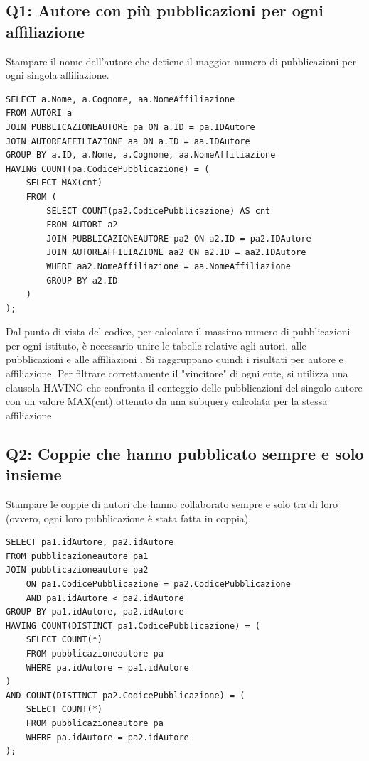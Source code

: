 \documentclass[a4paper,12pt]{article}
\begin{document}
\subsection*{Q1: Autore con più pubblicazioni per ogni affiliazione}
 Stampare il nome dell'autore che detiene il maggior numero di pubblicazioni per ogni singola affiliazione.
\begin{lstlisting}
SELECT a.Nome, a.Cognome, aa.NomeAffiliazione
FROM AUTORI a
JOIN PUBBLICAZIONEAUTORE pa ON a.ID = pa.IDAutore
JOIN AUTOREAFFILIAZIONE aa ON a.ID = aa.IDAutore
GROUP BY a.ID, a.Nome, a.Cognome, aa.NomeAffiliazione
HAVING COUNT(pa.CodicePubblicazione) = (
    SELECT MAX(cnt)
    FROM (
        SELECT COUNT(pa2.CodicePubblicazione) AS cnt
        FROM AUTORI a2
        JOIN PUBBLICAZIONEAUTORE pa2 ON a2.ID = pa2.IDAutore
        JOIN AUTOREAFFILIAZIONE aa2 ON a2.ID = aa2.IDAutore
        WHERE aa2.NomeAffiliazione = aa.NomeAffiliazione
        GROUP BY a2.ID
    )
);
\end{lstlisting}

Dal punto di vista del codice, per calcolare il massimo numero di pubblicazioni per ogni istituto, è necessario unire le tabelle relative agli autori, alle pubblicazioni e alle affiliazioni . Si raggruppano quindi i risultati per autore e affiliazione. Per filtrare correttamente il "vincitore" di ogni ente, si utilizza una clausola HAVING che confronta il conteggio delle pubblicazioni del singolo autore con un valore MAX(cnt) ottenuto da una subquery calcolata per la stessa affiliazione


\subsection*{Q2: Coppie che hanno pubblicato sempre e solo insieme}
Stampare le coppie di autori che hanno collaborato sempre e solo tra di loro (ovvero, ogni loro pubblicazione è stata fatta in coppia). 
\begin{lstlisting}
SELECT pa1.idAutore, pa2.idAutore
FROM pubblicazioneautore pa1
JOIN pubblicazioneautore pa2 
    ON pa1.CodicePubblicazione = pa2.CodicePubblicazione 
    AND pa1.idAutore < pa2.idAutore
GROUP BY pa1.idAutore, pa2.idAutore
HAVING COUNT(DISTINCT pa1.CodicePubblicazione) = (
    SELECT COUNT(*) 
    FROM pubblicazioneautore pa
    WHERE pa.idAutore = pa1.idAutore
)
AND COUNT(DISTINCT pa2.CodicePubblicazione) = (
    SELECT COUNT(*) 
    FROM pubblicazioneautore pa
    WHERE pa.idAutore = pa2.idAutore
);

\end{lstlisting}
\end{document}
